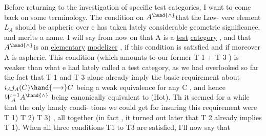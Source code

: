 Before returning to the investigation of specific test categories,
I want to come back on some terminology.  The condition on $A^{\hand{\wedge}}$\hand{/}that the Law-%
vere element $L_A$ should be aspheric over e has taken lately considerable
geometric significance,  and merits a name.  I will say from now on that
A is a \uline{test} \uline{category} ,  and that $A^{\hand{\wedge}}$is an \uline{elementary} \uline{modelizer} ,  if this
condition is satisfied\hand{,}  and if moreover A is aspheric.  This condition
 (which amounts to our former  T 1  + T 3 ) is weaker than what e had
lately called a test category,  as we had overlooked so far the fact that
T 1 and T 3  alone already imply the basic requirement about  $i_Aj_A(C) \hand{\longrightarrow} C$
being a weak equivalence for any C , and hence $W_A^{-1}A^{\hand{\wedge}}$ being canonically
equivalent to (Hot).  Th it seemed for a while that the only handy condi-%
tions we could get for insuring this requirement were T 1) T 2) T 3) ,
all together (in fact , it turned out later that T 2  already implies
T 1).  When all three conditions T1 to T3 are satisfied,  I'll now say that
